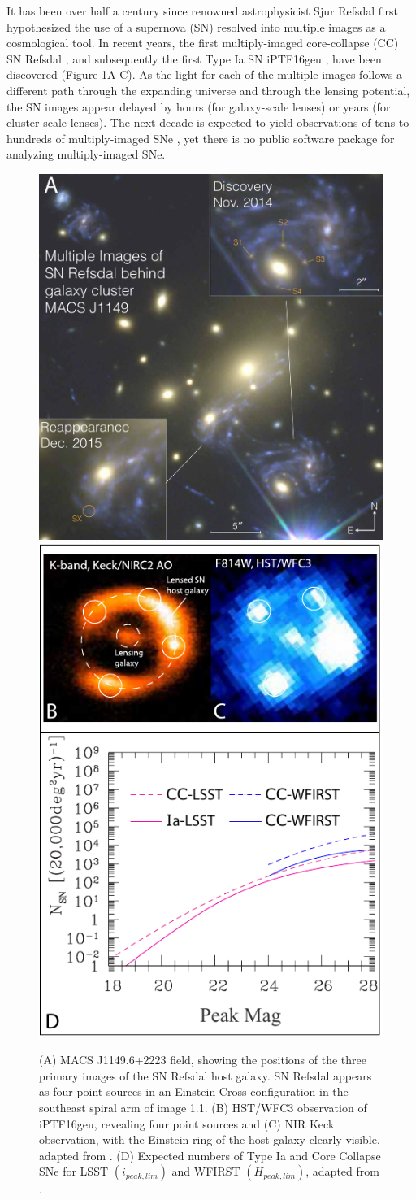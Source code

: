 It has been over half a century since renowned astrophysicist Sjur
Refsdal first hypothesized the use of a supernova (SN) resolved into
multiple images as a cosmological tool. In recent years, the first
multiply-imaged core-collapse (CC) SN Refsdal \citep{Kelly:2015a}, and
subsequently the first Type Ia SN iPTF16geu \citep{Goobar:2016}, have
been discovered (Figure 1A-C). As the light for each of the multiple
images follows a different path through the expanding universe and
through the lensing potential, the SN images appear delayed by hours
(for galaxy-scale lenses) or years (for cluster-scale lenses). The
next decade is expected to yield observations of tens to hundreds of
multiply-imaged SNe \citep{Oguri:2010}, yet there is no public
software package for analyzing multiply-imaged SNe.
\begin{figure}
\includegraphics[height=.3\textwidth]{FIG/refsdal_summary2}
\includegraphics[height=.3\textwidth]{FIG/lensed3}
\caption{
(A) MACS J1149.6+2223 field, showing the positions of the three primary
images of the SN Refsdal host galaxy. SN
Refsdal appears as four point sources in an Einstein Cross
configuration in the southeast spiral arm of image 1.1. (B) HST/WFC3 observation
of iPTF16geu, revealing four point sources and (C) NIR Keck observation, with the 
Einstein ring of the host galaxy clearly visible, adapted from \citet{Goobar:2016}. (D)
Expected numbers of Type Ia and Core Collapse SNe for LSST $(i_{peak,lim})$ and 
WFIRST $(H_{peak,lim})$, adapted from \citet{Oguri:2010a}.}
\end{figure}

